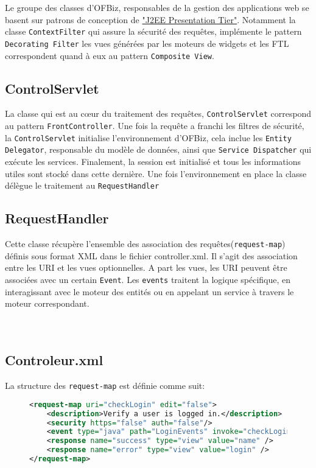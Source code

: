 Le groupe des classes d'OFBiz, responsables de la gestion des applications web se basent sur patrons de conception de   \href{http://www2.sys-con.com/itsg/virtualcd/java/archives/0701/malks/index.html}{"J2EE Presentation Tier"}. Notamment la classe \verb|ContextFilter| qui assure la sécurité des requêtes, implémente le pattern \verb|Decorating Filter|  les vues générées par les moteurs de widgets et les FTL correspondent quand à eux au pattern \verb|Composite View|.
\subsection{ControlServlet}
La classe qui est au cœur du traitement des requêtes, \verb|ControlServlet| correspond au pattern \verb|FrontController|.
Une fois la requête a franchi les filtres de sécurité, la \verb|ControlServlet| initialise l'environnement d'OFBiz, cela inclue les \verb|Entity Delegator|, responsable du modèle de données, ainsi que  \verb|Service Dispatcher| qui exécute les services. Finalement, la session est initialisé et tous les informations utiles sont stocké dans cette dernière. Une fois l'environnement en place la classe délègue le traitement au \verb|RequestHandler|

\subsection{RequestHandler}
Cette classe récupère l'ensemble des association des requêtes(\verb|request-map|) définis sous format XML dans le fichier controller.xml. Il s'agit des association entre les URI et les vues optionnelles. A part les vues, les URI peuvent être associées avec un certain \verb|Event|. Les \verb|events| traitent la logique spécifique, en interagissant avec le moteur des entités ou en appelant un service à travers le moteur correspondant. 
\\
\\
\\
\subsection{Controleur.xml}
La structure des \verb|request-map| est définie comme suit:
\begin{figure}[h!]
	\begin{lstlisting}[language=XML,frame=leftline]
<request-map uri="checkLogin" edit="false">
    <description>Verify a user is logged in.</description>
    <security https="false" auth="false"/>
    <event type="java" path="LoginEvents" invoke="checkLogin"/>
    <response name="success" type="view" value="name" />
    <response name="error" type="view" value="login" />
</request-map>
	\end{lstlisting}
\end{figure}\\
\\
